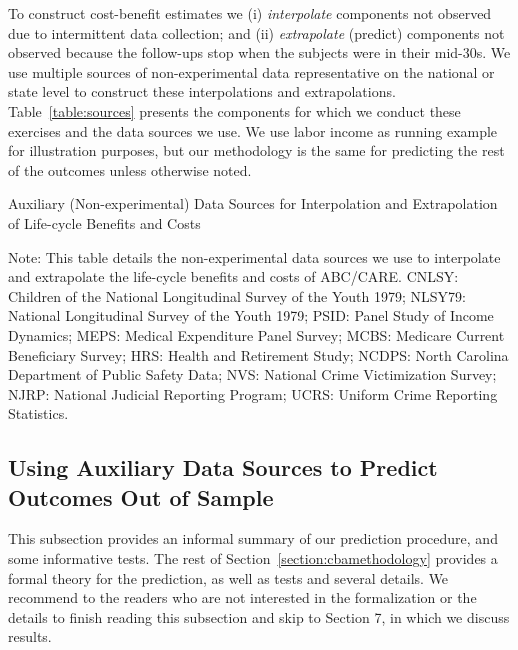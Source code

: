 \noindent To construct cost-benefit estimates we (i) \textit{interpolate} components not observed due to intermittent data collection; and (ii) \textit{extrapolate} (predict) components not observed because the follow-ups stop when the subjects were in their mid-30s. We use multiple sources of non-experimental data representative on the national or state level to construct these interpolations and extrapolations. Table~\ref{table:sources} presents the components for which we conduct these exercises and the data sources we use. We use labor income as running example for illustration purposes, but our methodology is the same for predicting the rest of the outcomes unless otherwise noted.

\begin{table}[!htbp]
\begin{threeparttable}
\caption{Auxiliary (Non-experimental) Data Sources for Interpolation and Extrapolation of Life-cycle Benefits and Costs} \label{table:sources}
\footnotesize

\begin{tablenotes}
\footnotesize
Note: This table details the non-experimental data sources we use to interpolate and extrapolate the life-cycle benefits and costs of ABC/CARE. CNLSY: Children of the National Longitudinal Survey of the Youth 1979; NLSY79: National Longitudinal Survey of the Youth 1979; PSID: Panel Study of Income Dynamics; MEPS: Medical Expenditure Panel Survey; MCBS: Medicare Current Beneficiary Survey; HRS: Health and Retirement Study; NCDPS: North Carolina Department of Public Safety Data; NVS: National Crime Victimization Survey; NJRP: National Judicial Reporting Program; UCRS: Uniform Crime Reporting Statistics.
\end{tablenotes}
\end{threeparttable}
\end{table}


\subsection{Using Auxiliary Data Sources to Predict Outcomes Out of Sample}\label{sec:usingaux}

\noindent This subsection provides an informal summary of our prediction procedure, and some informative tests. The rest of Section~\ref{section:cbamethodology} provides a formal theory for the prediction, as well as tests and several details. We recommend to the readers who are not interested in the formalization or the details to finish reading this subsection and skip to Section 7, in which we discuss results.\\

